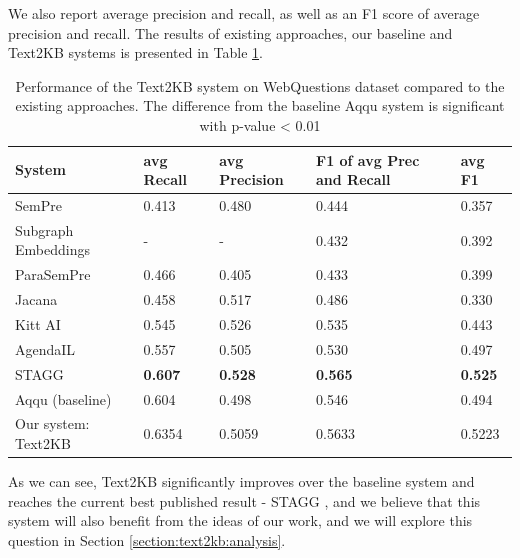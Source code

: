 We also report average precision and recall, as well as an F1 score of average precision and recall.
The results of existing approaches, our baseline and Text2KB systems is presented in Table \ref{table:text2kb:webquestions_results}.

\begin{table}
\centering
\caption{Performance of the Text2KB system on WebQuestions dataset compared to the existing approaches. The difference from the baseline Aqqu system is significant with p-value < 0.01}
\label{table:text2kb:webquestions_results}
\begin{tabular}{| p{5cm} | p{1.5cm} | p{1.5cm} | p{1.5cm} | p{1.5cm} | }
\hline
System & avg Recall & avg Precision & F1 of avg Prec and Recall & avg F1 \\
\hline
SemPre \cite{BerantCFL13:sempre} & 0.413 & 0.480 & 0.444 & 0.357\\
Subgraph Embeddings \cite{BordesCW14:emnlp} & - & - & 0.432 & 0.392\\
ParaSemPre \cite{BerantL14:parasempre} & 0.466 & 0.405 & 0.433 & 0.399\\
Jacana \cite{YaoD14} & 0.458 & 0.517 & 0.486 & 0.330\\
Kitt AI \cite{yao-scratch-qa-naacl2015} & 0.545 & 0.526 & 0.535 & 0.443\\
AgendaIL \cite{berant2015imitation} & 0.557 & 0.505 & 0.530 & 0.497\\
STAGG \cite{yih:ACL:2015:STAGG} & \textbf{0.607} & \textbf{0.528} & \textbf{0.565} & \textbf{0.525}\\
\hline
Aqqu (baseline) \cite{bastmore:cikm:2015:aquu} & 0.604 & 0.498 & 0.546 & 0.494\\
Our system: Text2KB & 0.6354 & 0.5059 & 0.5633 & 0.5223 \\
\hline
\end{tabular}
\end{table}

As we can see, Text2KB significantly improves over the baseline system and reaches the current best published result - STAGG \cite{yih:ACL:2015:STAGG}, and we believe that this system will also benefit from the ideas of our work, and we will explore this question in Section \ref{section:text2kb:analysis}.

